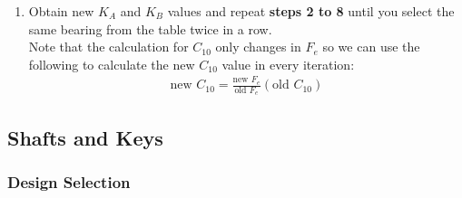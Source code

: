 \documentclass[11pt, fleqn]{article}
\begin{document}
\begin{enumerate}
    \item Obtain new $K_A$ and $K_B$ values and repeat \textbf{steps 2 to 8} until you select the same bearing from the table twice in a row.\\
    Note that the calculation for $C_{10}$ only changes in $F_e$ so we can use the following to calculate the new $C_{10}$ value in every iteration:
    \begin{align*}
        \text{new } C_{10} = \frac{\text{new } F_e}{\text{old } F_e}(\text{old } C_{10})
    \end{align*}
\end{enumerate}
\subsection{Shafts and Keys}
\subsubsection{Design Selection}
\end{document}
